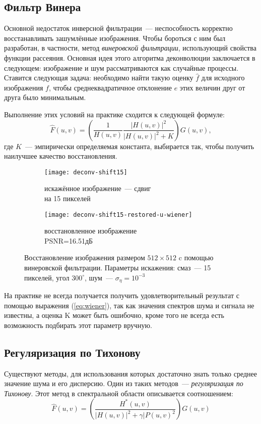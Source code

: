 \subsection{Фильтр Винера}
Основной недостаток инверсной фильтрации~--- неспособность корректно восстанавливать зашумлённые изображения. Чтобы бороться с ним был разработан, в частности, метод \textit{винеровской фильтрации}, использующий свойства функции рассеяния. Основная идея этого алгоритма деконволюции заключается в следующем: изображение и шум рассматриваются как случайные процессы. Ставится следующая задача: необходимо найти такую оценку $\hat{f}$ для исходного изображения $f$, чтобы среднеквадратичное отклонение $e$ этих величин друг от друга было минимальным.

Выполнение этих условий на практике сходится к следующей формуле:
\begin{equation}\label{eq:wiener}
\hat{F}(u,v)=\left(\frac{1}{H(u,v)}\frac{|H(u,v)|^2}{|H(u,v)|^2+K}\right)G(u,v),
\end{equation}
где $K$~--- эмпирически определяемая константа, выбирается так, чтобы получить наилучшее качество восстановления.

\begin{figure}[h!]
	\begin{subfigure}[b]{0.5\textwidth}
		\texttt{[image: deconv-shift15]}
		\caption{искажённое изображение~--- сдвиг \\на 15 пикселей}
		\label{fig:astroShift15}
	\end{subfigure}%
	\begin{subfigure}[b]{0.5\textwidth}
		\texttt{[image: deconv-shift15-restored-u-wiener]}
		\caption{восстановленное изображение\\ PSNR=16.51дБ}
		\label{fig:astroWienerRestored}
	\end{subfigure}%
	\caption{Восстановление изображения размером $512\times 512$ c помощью винеровской фильтрации. Параметры искажения: смаз~--- 15 пикселей, угол $300^\circ$, шум~--- $\sigma_\eta=10^{-3}$}
\end{figure}
На практике не всегда получается получить удовлетворительный результат с помощью выражения (\ref{eq:wiener}), так как значения спектров шума и сигнала не известны, а оценка K может быть ошибочно, кроме того не всегда есть возможность подбирать этот параметр вручную.

\subsection{Регуляризация по Тихонову}
Существуют методы, для использования которых достаточно знать только среднее значение шума и его дисперсию. Один из таких методов~--- \textit{регуляризация по Тихонову}. Этот метод в спектральной области описывается соотношением\cite[стр.~418]{gonsalesDigital2012}:
\begin{equation}\label{eq:tikhonov}
\hat{F}(u,v) = \left(\frac{H^*(u,v)}{|H(u,v)|^2 + \gamma|P(u,v)^2}\right)G(u,v)
\end{equation}

